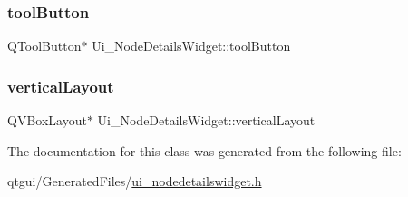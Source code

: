 \subsubsection{\texorpdfstring{toolButton}{toolButton}}
{\footnotesize\ttfamily Q\+Tool\+Button$\ast$ Ui\+\_\+\+Node\+Details\+Widget\+::tool\+Button}

\mbox{\label{class_ui___node_details_widget_a980304a66073bba134ef50aa75d18449}} 
\subsubsection{\texorpdfstring{verticalLayout}{verticalLayout}}
{\footnotesize\ttfamily Q\+V\+Box\+Layout$\ast$ Ui\+\_\+\+Node\+Details\+Widget\+::vertical\+Layout}



The documentation for this class was generated from the following file\+:\begin{DoxyCompactItemize}
\item 
qtgui/\+Generated\+Files/\mbox{\hyperlink{ui__nodedetailswidget_8h}{ui\+\_\+nodedetailswidget.\+h}}\end{DoxyCompactItemize}
